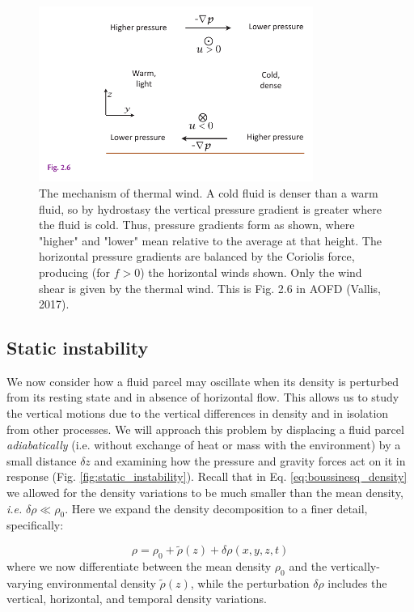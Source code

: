 \documentclass[12pt]{article}
\numberwithin{equation}{section}
\numberwithin{figure}{section}
\numberwithin{table}{section}
\begin{document}
\begin{figure}[h]
  \centering
  \includegraphics[width=0.8\textwidth]{assets/fig_thermal_wind.pdf}
  \caption{
    The mechanism of thermal wind. A cold fluid is denser than a warm fluid,
    so by hydrostasy the vertical pressure gradient is greater where the fluid
    is cold. Thus, pressure gradients form as shown, where "higher" and "lower"
    mean relative to the average at that height. The horizontal pressure gradients
    are balanced by the Coriolis force, producing (for $f > 0$) the horizontal
    winds shown. Only the wind shear is given by the thermal wind.
    This is Fig. 2.6 in AOFD (Vallis, 2017).
  }
  \label{fig:thermal_wind}
\end{figure}

\subsection{Static instability}

We now consider how a fluid parcel may oscillate when its density is perturbed
from its resting state and in absence of horizontal flow.
This allows us to study the vertical motions due to the vertical differences
in density and in isolation from other processes.
We will approach this problem by displacing a fluid parcel
\textit{adiabatically}
(i.e. without exchange of heat or mass with the environment) by a small distance
$\delta z$ and examining how the pressure and gravity forces act on it in response
(Fig. \ref{fig:static_instability}).
Recall that in Eq. \ref{eq:boussinesq_density} we allowed for the density
variations to be much smaller than the mean density, \textit{i.e.}
$\delta \rho \ll \rho_0$.
Here we expand the density decomposition to a finer detail, specifically:

\begin{equation}
  \rho = \rho_0 + \widetilde{\rho}(z) + \delta \rho(x, y, z, t)
\end{equation}
where we now differentiate between the mean density $\rho_0$ and the
vertically-varying environmental density $\widetilde{\rho}(z)$, while the 
perturbation $\delta \rho$ includes the vertical, horizontal, and temporal
density variations.
\end{document}
